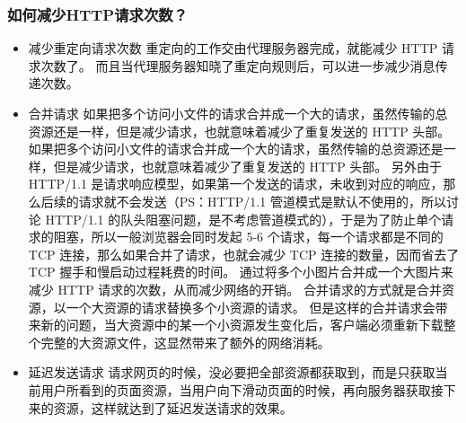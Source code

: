 \documentclass[11pt]{article}
\begin{document}
\subsubsection{如何减少HTTP请求次数？}
\label{sec:org150ef28}
\begin{itemize}
\item 减少重定向请求次数
重定向的工作交由代理服务器完成，就能减少 HTTP 请求次数了。
而且当代理服务器知晓了重定向规则后，可以进一步减少消息传递次数。
\item 合并请求
如果把多个访问小文件的请求合并成一个大的请求，虽然传输的总资源还是一样，但是减少请求，也就意味着减少了重复发送的 HTTP 头部。如果把多个访问小文件的请求合并成一个大的请求，虽然传输的总资源还是一样，但是减少请求，也就意味着减少了重复发送的 HTTP 头部。
另外由于 HTTP/1.1 是请求响应模型，如果第一个发送的请求，未收到对应的响应，那么后续的请求就不会发送（PS：HTTP/1.1 管道模式是默认不使用的，所以讨论 HTTP/1.1 的队头阻塞问题，是不考虑管道模式的），于是为了防止单个请求的阻塞，所以一般浏览器会同时发起 5-6 个请求，每一个请求都是不同的 TCP 连接，那么如果合并了请求，也就会减少 TCP 连接的数量，因而省去了 TCP 握手和慢启动过程耗费的时间。
通过将多个小图片合并成一个大图片来减少 HTTP 请求的次数，从而减少网络的开销。
合并请求的方式就是合并资源，以一个大资源的请求替换多个小资源的请求。
但是这样的合并请求会带来新的问题，当大资源中的某一个小资源发生变化后，客户端必须重新下载整个完整的大资源文件，这显然带来了额外的网络消耗。
\item 延迟发送请求
请求网页的时候，没必要把全部资源都获取到，而是只获取当前用户所看到的页面资源，当用户向下滑动页面的时候，再向服务器获取接下来的资源，这样就达到了延迟发送请求的效果。
\end{itemize}
\end{document}
